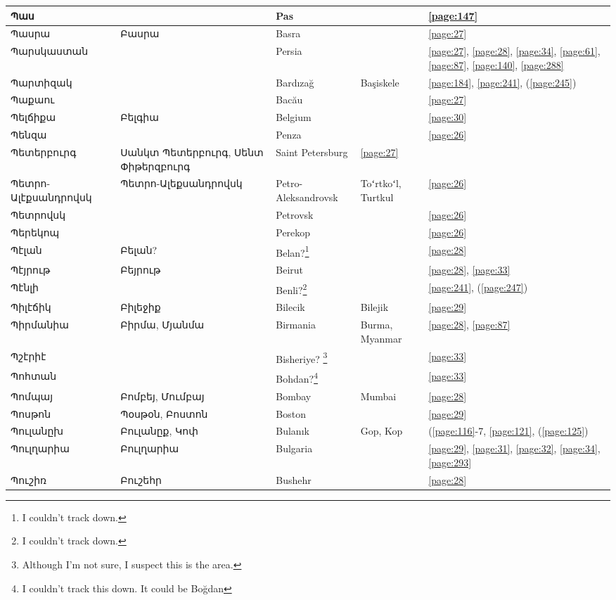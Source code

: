 \begin{center}
\begin{longtable}{|p{}|p{3cm}|p{3cm}|p{2cm}|p{3cm}|}
Պաս& & Pas& &\ref{page:147}\\ \hline
Պասրա& Բասրա& Basra& &\ref{page:27}\\ \hline
Պարսկաստան& & 
Persia& &\ref{page:27}, \ref{page:28}, \ref{page:34}, \ref{page:61}, \ref{page:87}, \ref{page:140}, \ref{page:288}\\ \hline
Պարտիզակ& & Bardızağ&Başiskele   &\ref{page:184}, \ref{page:241}, (\ref{page:245})\\ \hline
Պաքաու& &Bacău & &\ref{page:27}\\ \hline
Պելճիքա&Բելգիա &Belgium & &\ref{page:30}\\ \hline
Պենզա& &Penza& &\ref{page:26}\\ \hline
Պետերբուրգ& Սանկտ Պետերբուրգ, Սենտ Փիթերզբուրգ &   Saint Petersburg  &\ref{page:27}\\ \hline
Պետրո-Ալէքսանդրովսկ&Պետրո-Ալեքսանդրովսկ & Petro-Aleksandrovsk&Toʻrtkoʻl, Turtkul &\ref{page:26}\\ \hline
Պետրովսկ& & Petrovsk& &\ref{page:26}\\ \hline
Պերեկոպ& &Perekop & &\ref{page:26}\\ \hline
Պէլան& Բելան?& Belan?\footnote{I couldn't track down. }& &\ref{page:28}\\ \hline
Պէյրութ&   Բեյրութ&Beirut & &\ref{page:28}, \ref{page:33}\\ \hline
Պէնլի& &Benli?\footnote{I couldn't track down.} & &\ref{page:241}, (\ref{page:247})\\ \hline
Պիլէճիկ&Բիլեջիք& Bilecik&Bilejik &\ref{page:29}\\ \hline
Պիրմանիա& Բիրմա, Մյանմա  &Birmania  &Burma, Myanmar &\ref{page:28}, \ref{page:87}\\ \hline
Պշէրիէ& &Bisheriye? \footnote{Although I'm not sure, I suspect this is the area.} & &\ref{page:33}\\ \hline
Պոհտան& &Bohdan?\footnote{I couldn't track this down. It could be Boğdan} & &\ref{page:33}\\ \hline
Պոմպայ& Բոմբեյ, Մումբայ&      Bombay  &Mumbai &\ref{page:28}\\ \hline
Պոսթոն&Պօսթօն, Բոստոն & Boston& &\ref{page:29}\\ \hline
Պուլանըխ&Բուլանըք, Կոփ & Bulanık  &Gop, Kop &(\ref{page:116}-7, \ref{page:121}, (\ref{page:125})\\ \hline
Պուլղարիա& Բուլղարիա& Bulgaria& &\ref{page:29}, \ref{page:31}, \ref{page:32}, \ref{page:34}, \ref{page:293}\\ \hline
Պուշիռ& Բուշեհր&Bushehr & &\ref{page:28}\\ \hline

\end{longtable}
\end{center}

